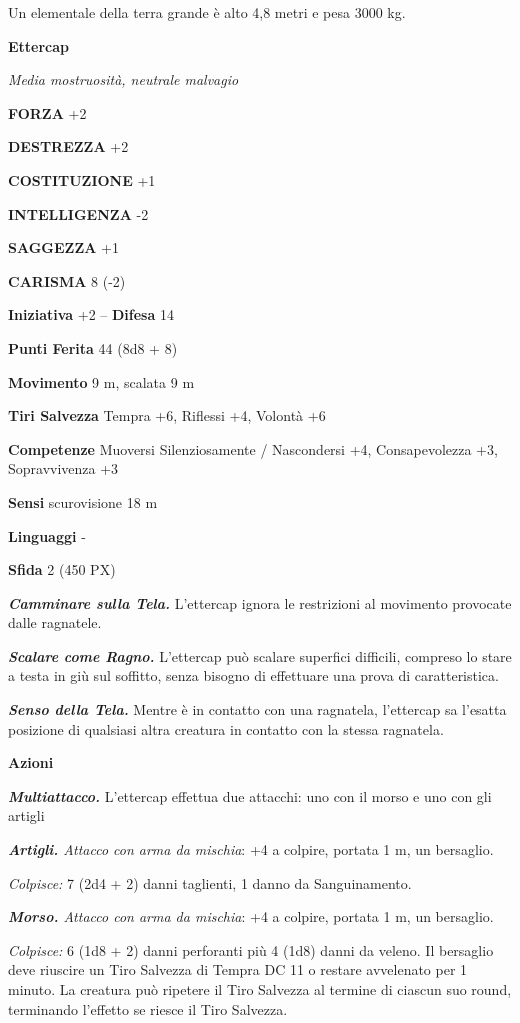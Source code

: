 \begin{multicols}{2}
	Un elementale della terra grande è alto 4,8 metri e pesa 3000 kg.


	\medskip{}\textbf{Ettercap}

	\textit{Media mostruosità, neutrale malvagio}

	\textbf{FORZA} +2

	\textbf{DESTREZZA} +2

	\textbf{COSTITUZIONE} +1

	\textbf{INTELLIGENZA} -2

	\textbf{SAGGEZZA} +1

	\textbf{CARISMA} 8 (-2)

	\textbf{Iniziativa} +2 -- \textbf{Difesa} 14

	\textbf{Punti Ferita} 44 (8d8 + 8)

	\textbf{Movimento} 9 m, scalata 9 m

	\textbf{Tiri Salvezza} Tempra +6, Riflessi +4, Volontà +6

	\textbf{Competenze} Muoversi Silenziosamente / Nascondersi +4, Consapevolezza +3, Sopravvivenza +3

	\textbf{Sensi} scurovisione 18 m

	\textbf{Linguaggi} -

	\textbf{Sfida} 2 (450 PX)

	\textit{\textbf{Camminare sulla Tela.}} L'ettercap ignora le restrizioni al movimento provocate dalle ragnatele.

	\textit{\textbf{Scalare come Ragno.}} L'ettercap può scalare superfici difficili, compreso lo stare a testa in giù sul soffitto, senza bisogno di effettuare una prova di caratteristica.

	\textit{\textbf{Senso della Tela.}} Mentre è in contatto con una ragnatela, l'ettercap sa l'esatta posizione di qualsiasi altra creatura in contatto con la stessa ragnatela.

	\textbf{Azioni}

	\textit{\textbf{Multiattacco.}} L'ettercap effettua due attacchi: uno con il morso e uno con gli artigli

	\textit{\textbf{Artigli.} Attacco con arma da mischia}: +4 a colpire, portata 1 m, un bersaglio.

	\textit{Colpisce:} 7 (2d4 + 2) danni taglienti, 1 danno da Sanguinamento.

	\textit{\textbf{Morso.} Attacco con arma da mischia}: +4 a colpire, portata 1 m, un bersaglio.

	\textit{Colpisce:} 6 (1d8 + 2) danni perforanti più 4 (1d8) danni da veleno. Il bersaglio deve riuscire un Tiro Salvezza di Tempra DC 11 o restare avvelenato per 1 minuto. La creatura può ripetere il Tiro Salvezza al termine di ciascun suo round, terminando l'effetto se riesce il Tiro Salvezza.


\end{multicols}

